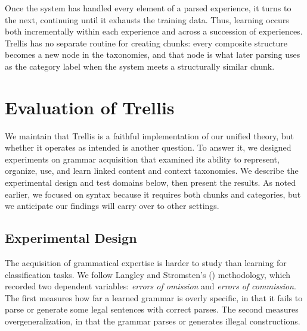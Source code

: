\documentclass[11pt,letterpaper]{article}
\def\trellis/{{\sc Trellis}}
\begin{document}


Once the system has handled every element of a parsed experience, it
turns to the next, continuing until it exhausts the training data.
Thus, learning occurs both incrementally within each experience and
across a succession of experiences. \trellis/ has no separate routine
for creating chunks: every composite structure becomes a new node in
the taxonomies, and that node is what later parsing uses as the 
category label when the system meets a structurally similar chunk. 

\section{Evaluation of \trellis/}

We maintain that \trellis/ is a faithful implementation of our unified
theory, but whether it operates as intended is another question. To
answer it, we designed experiments on grammar acquisition that examined
its ability to represent, organize, use, and learn linked content and
context taxonomies. We describe the experimental design and test
domains below, then present the results. As noted earlier, we focused 
on syntax because it requires both chunks and categories, but we 
anticipate our findings will carry over to other settings. 


\subsection{Experimental Design}

The acquisition of grammatical expertise is harder to study than
learning for classification tasks. We follow Langley and Stromsten's
(\citeyear{grids-langley-stromsten}) methodology, which recorded two
dependent variables: {\it errors of omission\/} and {\it errors of
commission}. The first measures how far a learned grammar is overly
specific, in that it fails to parse or generate some legal sentences
with correct parses. The second measures overgeneralization, in that
the grammar parses or generates illegal constructions.
\end{document}
